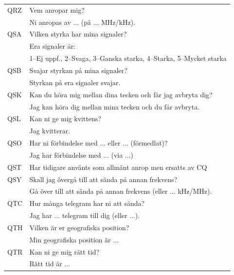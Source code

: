 \begin{longtable}{ll}
	QRZ          & Vem anropar mig?                                                     \\
                     & Ni anropas av ... (på ... MHz/kHz).                                  \\ \hline
	QSA          & Vilken styrka har mina signaler?                                     \\
                     & Era signaler är:                                                     \\
                     & 1--Ej uppf., 2--Svaga, 3--Ganska starka, 4--Starka, 5--Mycket starka \\ \hline
	QSB          & Svajar styrkan på mina signaler?                                     \\
                     & Styrkan på era signaler svajar.                                      \\ \hline
	QSK          & Kan du höra mig mellan dina tecken och får jag avbryta dig?          \\
                     & Jag kan höra dig mellan mina tecken och du får avbryta.              \\ \hline
	QSL          & Kan ni ge mig kvittens?                                              \\
                     & Jag kvitterar.                                                       \\ \hline
	QSO          & Har ni förbindelse med ... eller ... (förmedlat)?                     \\
                     & Jag har förbindelse med ... (via ...)                                \\ \hline
	QST          & Har tidigare använts som allmänt anrop men ersatts av CQ             \\ \hline
	QSY          & Skall jag övergå till att sända på annan frekvens?                   \\
                     & Gå över till att sända på annan frekvens (eller ... kHz/MHz).        \\ \hline
	QTC          & Hur många telegram har ni att sända?                                 \\
                     & Jag har ... telegram till dig (eller ...).                           \\ \hline
	QTH          & Vilken är er geografiska position?                                   \\
                     & Min geografiska position är ...                                      \\ \hline
	QTR          & Kan ni ge mig rätt tid?                                              \\
                     & Rätt tid är ...                                                      \\
\end{longtable}